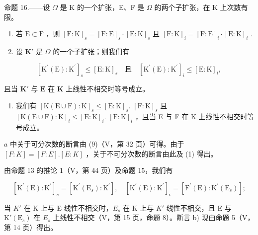 命题 16.——设 \(\Omega\) 是 K 的一个扩张，E、F 是 \(\Omega\) 的两个子扩张，在 K 上次数有限。

\begin{enumerate}
\def\labelenumi{\alph{enumi})}
\item
  若 \(\mathrm{E} \subset \mathrm{F}\) ，则 \([\mathrm{F}:\mathrm{K}]_s = [\mathrm{F}:\mathrm{E}]_s \cdot [\mathrm{E}:\mathrm{K}]_s\) 且 \([\mathrm{F}:\mathrm{K}]_i = [\mathrm{F}:\mathrm{E}]_i \cdot [\mathrm{E}:\mathrm{K}]_i\) .
\item
  设 \(\mathbf{K}'\) 是 \(\Omega\) 的一个子扩张；则我们有
\end{enumerate}

\[
\left[ \mathrm{K} ^ {\prime} (\mathrm{E}): \mathrm{K} ^ {\prime} \right] _ {s} \leqslant \left[ \mathrm{E}: \mathrm{K} \right] _ {s} \quad \text{且} \quad \left[ \mathrm{K} ^ {\prime} (\mathrm{E}): \mathrm{K} ^ {\prime} \right] _ {i} \leqslant \left[ \mathrm{E}: \mathrm{K} \right] _ {i},
\]

且当 \(\mathbf{K}'\) 与 \(\mathbf{E}\) 在 \(\mathbf{K}\) 上线性不相交时等号成立。

\begin{enumerate}
\def\labelenumi{\alph{enumi})}
\setcounter{enumi}{2}
\tightlist
\item
  我们有 \([\mathrm{K}(\mathrm{E}\cup \mathrm{F}):\mathrm{K}]_s\leqslant [\mathrm{E}:\mathrm{K}]_s.\) \([\mathrm{F}:\mathrm{K}]_s\) 且 \([\mathrm{K}(\mathrm{E}\cup \mathrm{F}):\mathrm{K}]_i\leqslant [\mathrm{E}:\mathrm{K}]_i.\) \([\mathrm{F}:\mathrm{K}]_i\) ，且当 E 与 F 在 K 上线性不相交时等号成立。
\end{enumerate}

\(a\) 中关于可分次数的断言由 (9)（V，第 32 页）可得。由于 \([F:K] = [F:E].[E:K]\) ，关于不可分次数的断言由此及 (1) 得出。

由命题 13 的推论 1（V，第 44 页）及命题 15，我们有

\[
\left[ \mathrm{K} ^ {\prime} (\mathrm{E}): \mathrm{K} ^ {\prime} \right] _ {s} = \left[ \mathrm{K} ^ {\prime} \left(\mathrm{E} _ {s}\right): \mathrm{K} ^ {\prime} \right], \quad \left[ \mathrm{K} ^ {\prime} (\mathrm{E}): \mathrm{K} ^ {\prime} \right] _ {i} = \left[ \mathrm{F} ^ {\prime} (\mathrm{E}): \mathrm{K} ^ {\prime} \left(\mathrm{E} _ {s}\right) \right];\tag{2}
\]

当 \(K'\) 在 K 上与 E 线性不相交时，\(E_{s}\) 在 K 上与 \(K'\) 线性不相交，且 E 与 \(\mathrm{K}'(\mathrm{E}_{s})\) 在 \(E_{s}\) 上线性不相交（V，第 15 页，命题 8）。断言 b) 现由命题 5（V，第 14 页）得出。

